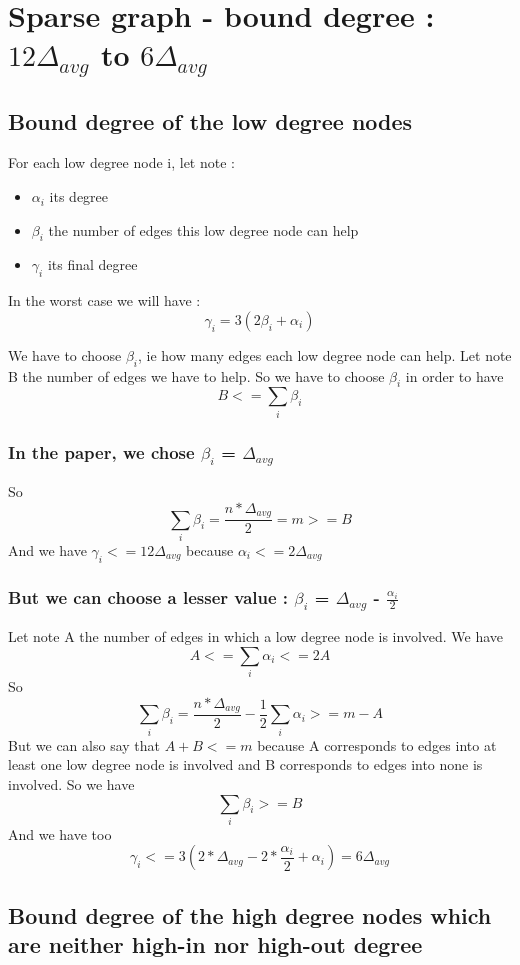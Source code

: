 \documentclass{article}
\begin{document}
\section{Sparse graph - bound degree : $12\Delta_{avg}$ to $6\Delta_{avg}$}

\subsection{Bound degree of the low degree nodes}

For each low degree node i, let note :
\begin{itemize}
    \item $\alpha_i$ its degree
    \item $\beta_i$ the number of edges this low degree node can help
    \item $\gamma_i$ its final degree
\end{itemize}
In the worst case we will have : $$\gamma_i = 3(2\beta_i + \alpha_i)$$

We have to choose $\beta_i$, ie how many edges each low degree node
can help. Let note B the number of edges we have to help.
So we have to choose $\beta_i$ in order to have $$B <= \sum_{i} \beta_i$$

\subsubsection{In the paper, we chose $\beta_i$ = $\Delta_{avg}$}

So $$\sum_{i} \beta_i = \frac{n*\Delta_{avg}}{2} = m >= B$$
And we have $\gamma_i <= 12\Delta_{avg}$ because $\alpha_i <= 2\Delta_{avg}$

\subsubsection{But we can choose a lesser value : $\beta_i$ = $\Delta_{avg}$ - $\frac{\alpha_i}{2}$}

Let note A the number of edges in which a low degree node is involved.
We have $$A <= \sum_{i} \alpha_i <= 2A$$
So $$\sum_{i} \beta_i = \frac{n*\Delta_{avg}}{2} - \frac{1}{2}\sum_{i} \alpha_i >= m - A$$
But we can also say that $ A + B <= m$ because A corresponds to edges
into at least one low degree node is involved and B corresponds to edges
into none is involved. So we have $$\sum_{i} \beta_i >= B$$
And we have too
$$\gamma_i <= 3(2*\Delta_{avg}-2*\frac{\alpha_i}{2}+\alpha_i) = 6\Delta_{avg}$$

\subsection{Bound degree of the high degree nodes which are neither high-in nor high-out degree}
\end{document}
